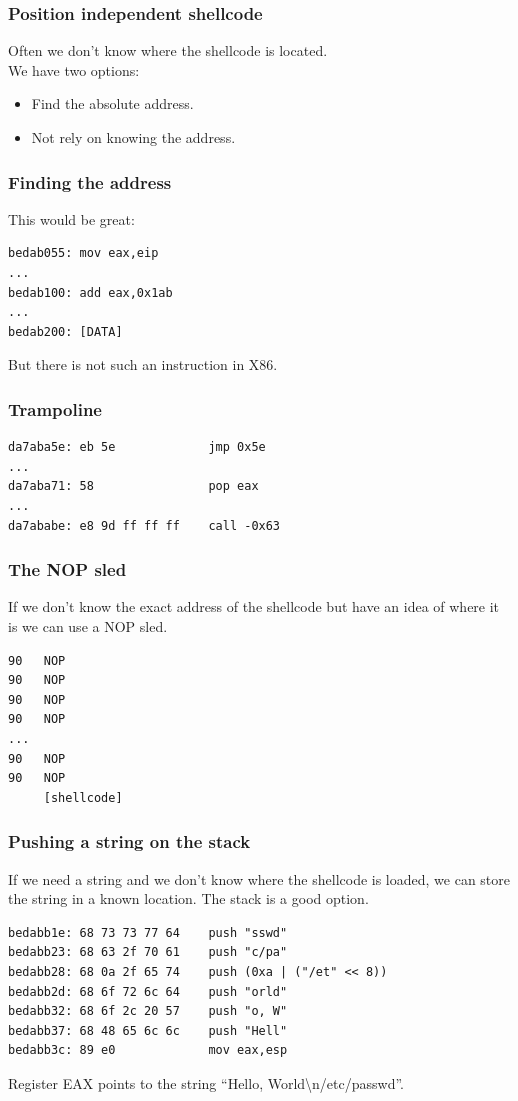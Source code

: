 \documentclass[slidestop,compress,mathserif, xcolor=table]{beamer}
\begin{document}
\begin{frame}
  \frametitle{Position independent shellcode}

  Often we don't know where the shellcode is located.\\[1em]

  We have two options:
  \begin{itemize}
  \item Find the absolute address.
  \item Not rely on knowing the address.
  \end{itemize}
\end{frame}

\begin{frame}[fragile]
  \frametitle{Finding the address}

  This would be great:
\begin{verbatim}
bedab055: mov eax,eip
...
bedab100: add eax,0x1ab
...
bedab200: [DATA]
\end{verbatim}

  But there is not such an instruction in X86.
\end{frame}

\begin{frame}[fragile]
  \frametitle{Trampoline}

\begin{verbatim}
da7aba5e: eb 5e             jmp 0x5e
...
da7aba71: 58                pop eax
...
da7ababe: e8 9d ff ff ff    call -0x63
\end{verbatim}
\end{frame}

\begin{frame}[fragile]
  \frametitle{The NOP sled}

  If we don't know the exact address of the shellcode but have an idea of where
  it is we can use a NOP sled.

\begin{verbatim}
90   NOP
90   NOP
90   NOP
90   NOP
...
90   NOP
90   NOP
     [shellcode]
\end{verbatim}
\end{frame}

\begin{frame}[fragile]
  \frametitle{Pushing a string on the stack}

  If we need a string and we don't know where the shellcode is loaded, we can
  store the string in a known location. The stack is a good option.

\begin{verbatim}
bedabb1e: 68 73 73 77 64    push "sswd"
bedabb23: 68 63 2f 70 61    push "c/pa"
bedabb28: 68 0a 2f 65 74    push (0xa | ("/et" << 8))
bedabb2d: 68 6f 72 6c 64    push "orld"
bedabb32: 68 6f 2c 20 57    push "o, W"
bedabb37: 68 48 65 6c 6c    push "Hell"
bedabb3c: 89 e0             mov eax,esp
\end{verbatim}

  Register EAX points to the string ``Hello, World\textbackslash n/etc/passwd''.
\end{frame}
\end{document}
